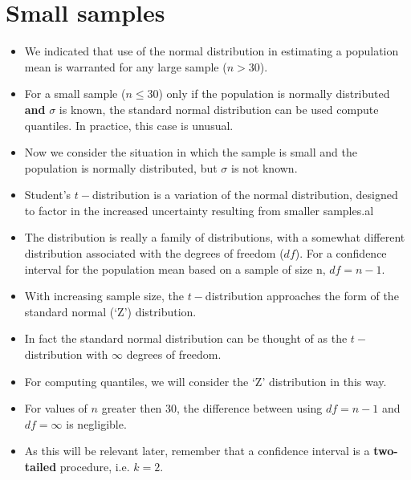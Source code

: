 \documentclass[]{report}
\begin{document}
\section{Small samples}
\begin{itemize} 
\item We indicated that use of the normal distribution in estimating a population mean is warranted
for any large sample ($n > 30$). 
\item For a small sample ($n \leq 30$) only if the population is normally distributed
\textbf{and} $\sigma$ is known, the standard normal distribution can be used compute quantiles. In practice,
this case is unusual.
\item Now we consider the situation in which the sample is small and the population is normally distributed,
but $\sigma$ is not known.
\end{itemize}

\begin{itemize}
\item Student's $t-$distribution is a variation of the normal distribution, designed to factor in the increased uncertainty resulting from smaller samples.al
\item The distribution is really a family of distributions, with a somewhat different distribution associated with the degrees of freedom ($df$). For a confidence interval for the population mean based on a sample of size n, $df = n - 1$.
\end{itemize}



\begin{itemize}
\item With increasing
sample size, the $t-$distribution approaches the form of the standard normal (`Z') distribution.
\item In fact the standard normal distribution can be thought of as the $t-$distribution with $\infty$ degrees of freedom.
\item For computing quantiles, we will consider the `Z' distribution in this way.
\item For values of $n$ greater then 30, the difference between using $df = n-1$ and $df = \infty$ is negligible.

\item As this will be relevant later, remember that a confidence interval is a \textbf{two-tailed} procedure, i.e. $k=2$.
\end{itemize}
\end{document}
